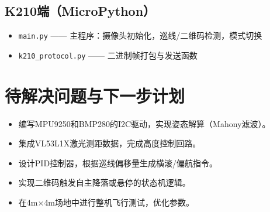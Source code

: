 \documentclass{article}
\begin{document}
\subsection{K210端（MicroPython）}
\begin{itemize}
    \item \texttt{main.py}               —— 主程序：摄像头初始化，巡线/二维码检测，模式切换
    \item \texttt{k210\_protocol.py}      —— 二进制帧打包与发送函数
\end{itemize}

\section{待解决问题与下一步计划}
\begin{itemize}
    \item 编写MPU9250和BMP280的I2C驱动，实现姿态解算（Mahony滤波）。
    \item 集成VL53L1X激光测距数据，完成高度控制回路。
    \item 设计PID控制器，根据巡线偏移量生成横滚/偏航指令。
    \item 实现二维码触发自主降落或悬停的状态机逻辑。
    \item 在4m$\times$4m场地中进行整机飞行测试，优化参数。
\end{itemize}
\end{document}
